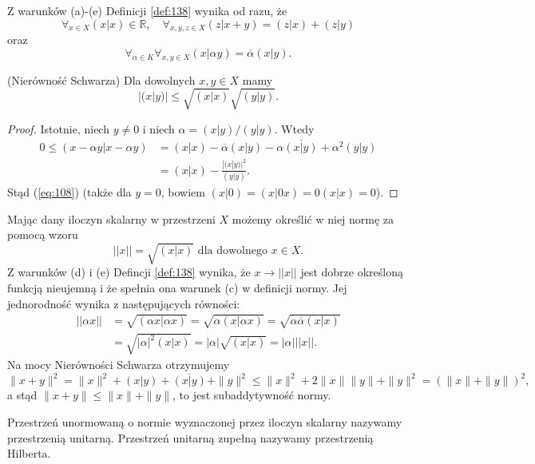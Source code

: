 \documentclass[leqno]{article}
\begin{document}
\begin{justify}
\begin{uwaga}
    Z warunków (a)-(e) Definicji \ref{def:138} wynika od razu, że
    \[
        \forall_{x \in X} (x|x) \in \mathbb{R}, \quad \forall_{x,y,z\in X} (z|x+y)= (z|x)+(z|y)
    \]
    oraz
    \[
        \forall_{\alpha \in K} \forall_{x,y \in X} (x|\alpha y)=\overline{\alpha}(x|y).
    \]
\end{uwaga}
\begin{theorem}
{
    (Nierówność Schwarza)
    Dla dowolnych \(x,y\in X\) mamy
        \begin{equation}\label{eq:108}
            |(x|y)|\leq \sqrt{(x|x)}\sqrt{(y|y)}.
        \end{equation}
}
\end{theorem}
\begin{proof}
    Istotnie, niech \(y\neq 0\) i niech \(\alpha = (x|y)/(y|y)\). Wtedy
    \begin{align*}
        0\leq(x-\alpha y| x-\alpha y) &= (x|x)-\overline{\alpha}(x|y)-\alpha\overline{(x|y)}+\alpha^2(y|y) \\
        &=(x|x)-\frac{|(x|y)|^2}{(y|y)}.
    \end{align*}
    Stąd (\ref{eq:108}) (także dla \(y=0\), bowiem \((x|0)=(x|0x)=0(x|x)=0\)).
\end{proof}

\begin{uwaga}
    Mając dany iloczyn skalarny w przestrzeni \(X\) możemy określić w niej normę za pomocą wzoru
    \[
        ||x||=\sqrt{(x|x)}\text{ dla dowolnego } x\in X.
    \]
    Z warunków (d) i (e) Defincji \ref{def:138} wynika, że \(x\to ||x||\) 
    jest dobrze określoną funkcją nieujemną i że spełnia ona warunek (c) w definicji normy. 
    Jej jednorodność wynika z następujących równości:
    \begin{align*}
        ||\alpha x|| &=\sqrt{(\alpha x|\alpha x)}
                     =\sqrt{\alpha( x|\alpha x)} 
                     =\sqrt{\alpha\overline{\alpha} (x|x)} \\
                     &=\sqrt{|\alpha|^2(x|x)}
                     =|\alpha|\sqrt{(x|x)}
                     =|\alpha|||x||.
    \end{align*}
    Na mocy Nierówności Schwarza otrzymujemy
    \[
        \|x+y\|^2=\|x\|^2+(x|y)+\overline{(x|y)}+\|y\|^2\leq \|x\|^2+2\|x\|\|y\|+\|y\|^2=(\|x\|+\|y\|)^2,
    \]
    a stąd \(\|x+y\|\leq\|x\|+\|y\|\), to jest subaddytywność normy.
\end{uwaga}

\begin{defn}
    Przestrzeń unormowaną o normie wyznaczonej przez iloczyn skalarny 
    nazywamy przestrzenią unitarną. 
    Przestrzeń unitarną zupełną nazywamy przestrzenią Hilberta.
\end{defn}


\end{justify}
\end{document}
